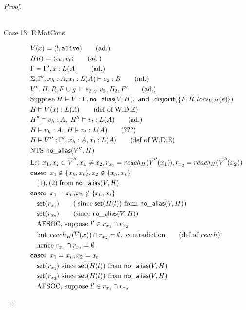 \documentclass[11pt]{article}
\newcommand{\ms}[1]{\ensuremath{\mathsf{#1}}}
\newcommand{\irl}[1]{\mathtt{#1}}
\newcommand{\na}[1]{\mathsf{no\_alias}(#1)}
\newcommand{\dist}[1]{\mathsf{disjoint}(#1)}
\begin{document}
\begin{proof}
\begin{description}
\begin{align*}
  \end{align*}
  \item [Case 13: E:MatCons]
  \begin{align*}
  &V(x) = (l,\irl{alive}) \tag{ad.}\\
  &H(l) = \pairexcst{v_h}{v_t} \tag{ad.}\\
  &\Gamma = \Gamma', x : L(A) \tag{ad.}\\
  &\Sigma; \Gamma', x_h : A, x_t : L(A) \vdash e_2 : B \tag{ad.}\\
  &V'',H,R,F \cup g \; \vdash e_2 \Downarrow v_2, H_2, F' \tag{ad.} \\
  &\text{Suppose } H \vDash V : \Gamma, \na{V,H}, \text{ and },\dist{\{F,R,locs_{V,H}(e)\}}\\
  &H \vDash V(x) : L(A) \tag{def of W.D.E}\\
  &H''\vDash v_h : A,\; H'' \vDash v_t : L(A) \tag{ad.}\\
  &H\vDash v_h : A,\; H \vDash v_t : L(A) \tag{???}\\
  &H \vDash V'' : \Gamma', x_h : A, x_t : L(A) \tag{def of W.D.E}\\
  &\text{NTS } \na{V'',H}\\
  &\text{Let } x_1, x_2 \in \overline V'', x_1 \ne x_2, r_{x_1} = reach_H(\overline V''(x_1)), r_{x_2} = reach_H(\overline V''(x_2))\\
  & \textbf{case: } x_1 \notin \{x_h,x_t\}, x_2 \notin \{x_h,x_t\}\\
  &\quad (1), (2) \text{ from } \na{V,H}\\
  & \textbf{case: } x_1 = x_h, x_2 \notin \{x_h,x_t\}\\
  &\quad \ms{set}(r_{x_1}) \tag{ since $\ms{set}(H(l))$ from  $\na{V,H}$}\\
  &\quad \ms{set}(r_{x_2}) \tag{since  $\na{V,H}$}\\
  &\quad \text{AFSOC, suppose } l' \in r_{x_1} \cap r_{x_2}\\
  &\quad \text{but } reach_H(\overline V(x)) \cap r_{x_2} = \emptyset, \text{ contradiction} \tag{def of $reach$}\\
  &\quad \text{hence } r_{x_1} \cap r_{x_2} = \emptyset\\
  & \textbf{case: } x_1 = x_h, x_2 = x_t\\
  &\quad \ms{set}(r_{x_1}) \text{ since } \ms{set}(H(l)) \text{ from } \na{V,H}\\
  &\quad \ms{set}(r_{x_2}) \text{ since } \ms{set}(H(l)) \text{ from } \na{V,H}\\
  &\quad \text{AFSOC, suppose } l' \in r_{x_1} \cap r_{x_2}\\

\end{align*}
\end{description}
\end{proof}
\end{document}
